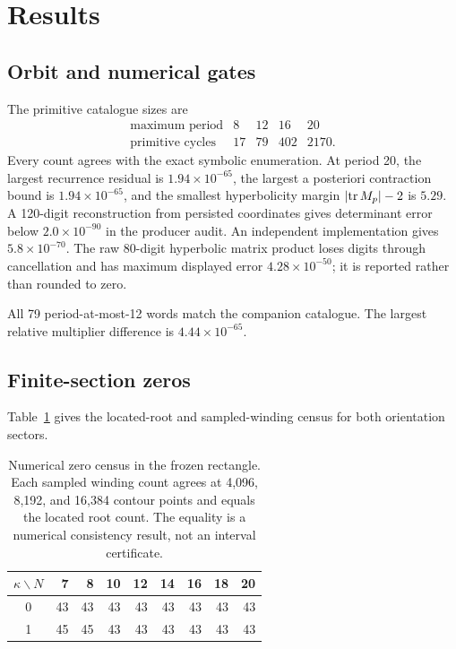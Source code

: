 \section{Results}
\label{sec:results}

\subsection{Orbit and numerical gates}

The primitive catalogue sizes are
\[
\begin{array}{c|rrrr}
\text{maximum period}&8&12&16&20\\\hline
\text{primitive cycles}&17&79&402&2170.
\end{array}
\]
Every count agrees with the exact symbolic enumeration.  At period 20, the
largest recurrence residual is \(1.94\times10^{-65}\), the largest
a posteriori contraction bound is \(1.94\times10^{-65}\), and the smallest
hyperbolicity margin \(\left|\operatorname{tr} M_p\right|-2\) is \(5.29\).  A 120-digit
reconstruction from persisted coordinates gives determinant error below
\(2.0\times10^{-90}\) in the producer audit.  An independent implementation
gives \(5.8\times10^{-70}\).  The raw 80-digit hyperbolic matrix product loses
digits through cancellation and has maximum displayed error
\(4.28\times10^{-50}\); it is reported rather than rounded to zero.

All 79 period-at-most-12 words match the companion catalogue.  The largest
relative multiplier difference is \(4.44\times10^{-65}\).

\subsection{Finite-section zeros}

Table~\ref{tab:counts} gives the located-root and sampled-winding census for
both orientation sectors.
\begin{table}[t]
\centering
\caption{Numerical zero census in the frozen rectangle.  Each sampled winding
count agrees at 4,096, 8,192, and 16,384 contour points and equals the located
root count.  The equality is a numerical consistency result, not an interval
certificate.}
\label{tab:counts}
\begin{tabular}{c@{\quad}rrrrrrrr}
\toprule
\(\kappa\backslash N\)&7&8&10&12&14&16&18&20\\
\midrule
0&43&43&43&43&43&43&43&43\\
1&45&45&43&43&43&43&43&43\\
\bottomrule
\end{tabular}
\end{table}

